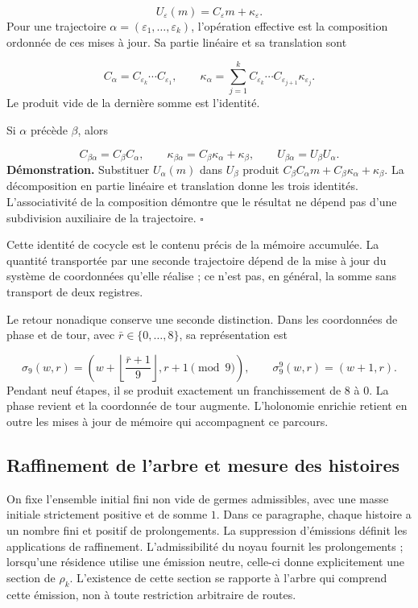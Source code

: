 \[
U_\varepsilon(m)=C_\varepsilon m+\kappa_\varepsilon.
\]
Pour une trajectoire \(\alpha=(\varepsilon_1,\ldots,\varepsilon_k)\), l'opération effective est la composition ordonnée de ces mises à jour. Sa partie linéaire et sa translation sont

\[
C_\alpha=C_{\varepsilon_k}\cdots C_{\varepsilon_1},
\qquad
\kappa_\alpha=
\sum_{j=1}^{k}C_{\varepsilon_k}\cdots
C_{\varepsilon_{j+1}}\kappa_{\varepsilon_j}.
\]
Le produit vide de la dernière somme est l'identité.

Si \(\alpha\) précède \(\beta\), alors

\[
C_{\beta\alpha}=C_\beta C_\alpha,
\qquad
\kappa_{\beta\alpha}=C_\beta\kappa_\alpha+\kappa_\beta,
\qquad
U_{\beta\alpha}=U_\beta U_\alpha.
\]
\textbf{Démonstration.} Substituer \(U_\alpha(m)\) dans \(U_\beta\) produit \(C_\beta C_\alpha m+C_\beta\kappa_\alpha+\kappa_\beta\). La décomposition en partie linéaire et translation donne les trois identités. L'associativité de la composition démontre que le résultat ne dépend pas d'une subdivision auxiliaire de la trajectoire. \hfill\(\square\)

Cette identité de cocycle est le contenu précis de la mémoire accumulée. La quantité transportée par une seconde trajectoire dépend de la mise à jour du système de coordonnées qu’elle réalise ; ce n’est pas, en général, la somme sans transport de deux registres.

Le retour nonadique conserve une seconde distinction. Dans les coordonnées de phase et de tour, avec \(\bar r\in\{0,\ldots,8\}\), sa représentation est

\[
\sigma_9(w,r)=
\left(w+\left\lfloor\frac{\bar r+1}{9}\right\rfloor,
r+1\pmod9\right),
\qquad
\sigma_9^9(w,r)=(w+1,r).
\]
Pendant neuf étapes, il se produit exactement un franchissement de \(8\) à \(0\). La phase revient et la coordonnée de tour augmente. L'holonomie enrichie retient en outre les mises à jour de mémoire qui accompagnent ce parcours.

\subsection{Raffinement de l'arbre et mesure des histoires}
On fixe l’ensemble initial fini non vide de germes admissibles, avec une masse initiale strictement positive et de somme \(1\). Dans ce paragraphe, chaque histoire a un nombre fini et positif de prolongements. La suppression d’émissions définit les applications de raffinement. L’admissibilité du noyau fournit les prolongements ; lorsqu’une résidence utilise une émission neutre, celle-ci donne explicitement une section de \(\rho_k\). L’existence de cette section se rapporte à l’arbre qui comprend cette émission, non à toute restriction arbitraire de routes.

